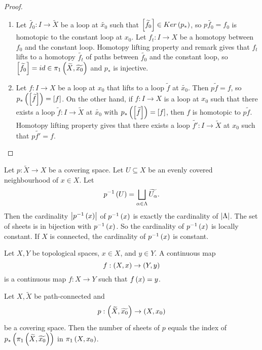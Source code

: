 \begin{proof}
\hfill
\begin{enumerate}
\item Let $ \widetilde{f_0} : I \to \widetilde{X} $ be a loop at $ \widetilde{x_0} $ such that $ \left[ \widetilde{f_0} \right] \in Ker\left( p_* \right) $, so $ p\widetilde{f_0} = f_0 $ is homotopic to the constant loop at $ x_0 $. Let $ f_t : I \to X $ be a homotopy between $ f_0 $ and the constant loop. Homotopy lifting property and remark gives that $ f_t $ lifts to a homotopy $ \widetilde{f_t} $ of paths between $ \widetilde{f_0} $ and the constant loop, so $ \left[ \widetilde{f_0} \right] = id \in \pi_1\left( \widetilde{X}, \widetilde{x_0} \right) $ and $ p_* $ is injective.
\item Let $ f : I \to X $ be a loop at $ x_0 $ that lifts to a loop $ \widetilde{f} $ at $ \widetilde{x_0} $. Then $ p\widetilde{f} = f $, so $ p_*\left( \left[ \widetilde{f} \right] \right) = \left[ f \right] $. On the other hand, if $ f : I \to X $ is a loop at $ x_0 $ such that there exists a loop $ \widetilde{f} : I \to \widetilde{X} $ at $ \widetilde{x_0} $ with $ p_*\left( \left[ \widetilde{f} \right] \right) = \left[ f \right] $, then $ f $ is homotopic to $ p\widetilde{f} $. Homotopy lifting property gives that there exists a loop $ \widetilde{f'} : I \to \widetilde{X} $ at $ x_0 $ such that $ p\widetilde{f'} = f $.
\end{enumerate}
\end{proof}


Let $ p : \widetilde{X} \to X $ be a covering space. Let $ U \subseteq X $ be an evenly covered neighbourhood of $ x \in X $. Let
$$ p^{-1}\left( U \right) = \bigsqcup_{\alpha \in \Lambda} \widetilde{U_\alpha}. $$
Then the cardinality $ \left\lvert p^{-1}\left( x \right) \right\rvert $ of $ p^{-1}\left( x \right) $ is exactly the cardinality of $ \left\lvert \Lambda \right\rvert $. The set of sheets is in bijection with $ p^{-1}\left( x \right) $. So the cardinality of $ p^{-1}\left( x \right) $ is locally constant. If $ X $ is connected, the cardinality of $ p^{-1}\left( x \right) $ is constant.

\begin{notation*}
Let $ X, Y $ be topological spaces, $ x \in X $, and $ y \in Y $. A continuous map
$$ f : \left( X, x \right) \to \left( Y, y \right) $$
is a continuous map $ f : X \to Y $ such that $ f\left( x \right) = y $.
\end{notation*}

\begin{proposition}
Let $ X, \widetilde{X} $ be path-connected and
$$ p : \left( \widetilde{X}, \widetilde{x_0} \right) \to \left( X, x_0 \right) $$
be a covering space. Then the number of sheets of $ p $ equals the index of $ p_*\left( \pi_1\left( \widetilde{X}, \widetilde{x_0} \right) \right) $ in $ \pi_1\left( X, x_0 \right) $.
\end{proposition}

